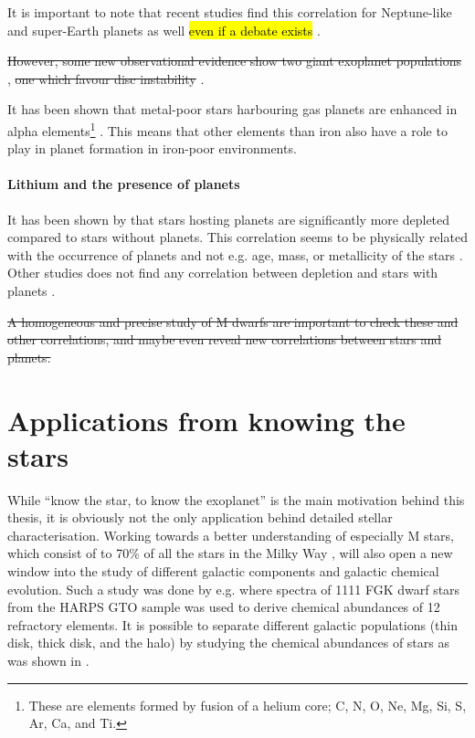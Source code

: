 It is important to note that recent studies find this correlation for Neptune-like and super-Earth
planets as well \citep{Adibekyan2012a,Wang2015,Zhu2016} \hl{even if a debate exists}
\citep{Sousa2011,Buchhave2012}.

\st{However, some new observational evidence show two giant exoplanet populations} \citep{Santos2017},
\st{one which favour disc instability} \citep[see e.g.][]{Nayakshin2017}.

It has been shown that metal-poor stars harbouring gas planets are enhanced in alpha
elements\footnote{These are elements formed by fusion of a helium core; C, N, O, Ne, Mg, Si, S, Ar,
Ca, and Ti.} \citep[see e.g.][]{Adibekyan2012a}. This means that other elements than iron also have
a role to play in planet formation in iron-poor environments.


\paragraph{Lithium and the presence of planets}

It has been shown by \citet{Israelian2004,Delgado2014,Figueira2014a,Gonzalez2015,Takeda2005} that
stars hosting planets are significantly more  depleted compared to stars without planets.
This correlation seems to be physically related with the occurrence of planets and not e.g. age,
mass, or metallicity of the stars \citep{Sousa2010}. Other studies does not find any correlation
between  depletion and stars with planets \citep{Baumann2010,Ramirez2012}.

\st{A homogeneous and precise study of M dwarfs are important to check these and other correlations,
and maybe even reveal new correlations between stars and planets.}

\section{Applications from knowing the stars}
\label{sec:stars_application}

While ``know the star, to know the exoplanet'' is the main motivation behind this thesis, it is
obviously not the only application behind detailed stellar characterisation. Working towards a
better understanding of especially M stars, which consist of to 70\% of all the stars in the Milky
Way \citep{Bochanski2010}, will also open a new window into the study of different galactic
components and galactic chemical evolution. Such a study was done by e.g.
\citet{Adibekyan2012,Delgado2017} where spectra of 1111 FGK dwarf stars from the HARPS GTO sample
was used to derive chemical abundances of 12 refractory elements. It is possible to separate
different galactic populations (thin disk, thick disk, and the halo) by studying the chemical
abundances of stars as was shown in \citet{Adibekyan2012}.

